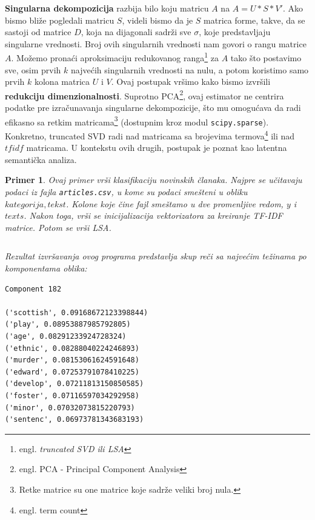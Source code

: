 \documentclass[a4paper]{article}
\newtheorem{primer}{Primer}[section]
\begin{document}
\textbf{Singularna dekompozicija} razbija bilo koju matricu $A$ na $A=U*S*V'$. Ako bismo bliže pogledali matricu $S$, videli bismo da je $S$ matrica forme, takve, da se sastoji od matrice $D$, koja na dijagonali sadrži sve $\sigma$, koje predstavljaju singularne vrednosti. Broj ovih singularnih vrednosti nam govori o rangu matrice $A$. Možemo pronaći aproksimaciju redukovanog ranga\footnote{engl. \em{truncated SVD} ili \em{LSA}} za $A$ tako što postavimo sve, osim prvih $k$ najvećih singularnih vrednosti na nulu, a potom koristimo samo prvih $k$ kolona matrica $U$ i $V$. Ovaj postupak vršimo kako bismo izvršili \textbf{redukciju dimenzionalnosti}. Suprotno PCA\footnote{engl. PCA - Principal Component Analysis}, ovaj estimator ne centrira podatke pre izračunavanja singularne dekompozicije, što mu omogućava da radi efikasno sa retkim matricama\footnote{Retke matrice su one matrice koje sadrže veliki broj nula.} (dostupnim kroz modul \texttt{scipy.sparse}). Konkretno, truncated SVD radi nad matricama sa brojevima termova\footnote{engl. term count} ili nad $tfidf$ matricama. U kontekstu ovih drugih, postupak je poznat kao latentna semantička analiza.\\
\begin{primer}
Ovaj primer vrši klasifikaciju novinskih članaka. Najpre se učitavaju podaci iz fajla \texttt{articles.csv}, u kome su podaci smešteni u obliku $kategorija, tekst$. Kolone koje čine fajl smeštamo u dve promenljive redom, $y$ i $texts$. Nakon toga, vrši se inicijalizacija vektorizatora za kreiranje TF-IDF matrice. Potom se vrši LSA.

\inputminted{python}{Codes/2/0-lsa.py}
Rezultat izvršavanja ovog programa predstavlja skup reči sa najvećim težinama po komponentama oblika:
\begin{lstlisting}
Component 182

('scottish', 0.09168672123398844)
('play', 0.08953887985792805)
('age', 0.08291233924728324)
('ethnic', 0.08288040224246893)
('murder', 0.08153061624591648)
('edward', 0.07253791078410225)
('develop', 0.07211813150850585)
('foster', 0.07116597034292958)
('minor', 0.07032073815220793)
('sentenc', 0.06973781343683193)
\end{lstlisting}
\end{primer}
\end{document}
